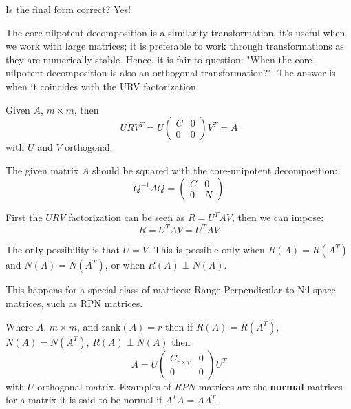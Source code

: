 Is the final form correct? Yes!

The core-nilpotent decomposition is a similarity transformation, it's useful when we work with large matrices;
it is preferable to work through transformations as they are numerically stable. 
Hence, it is fair to question: 
"When the core-nilpotent decomposition is also an orthogonal transformation?".
The answer is when it coincides with the URV factorization

Given \( A \), \( m \times m \), then
\[
U R V^T = U
\begin{pmatrix}
C & 0 \\
0 & 0
\end{pmatrix}
V^T = A
\]
with \( U \) and \( V \) orthogonal.


The given matrix \( A \) should be squared with the core-unipotent decomposition:
\[
Q^{-1} A Q = \begin{pmatrix}
C & 0 \\
0 & N
\end{pmatrix}
\]

First the $URV$ factorization can be seen as $ R = U^T A V $, then
we can impose:
\[ R = U^{T}AV = U^TA V \]

The only possibility is that \( U = V \). This is possible only when \( R(A) = R(A^T) \) and \( N(A) = N(A^T) \), or when \( R(A) \perp N(A) \).

This happens for a special class of matrices: Range-Perpendicular-to-Nil space matrices, such as RPN matrices.


Where \( A \), \( m \times m \), and \(\text{rank}(A) = r \) then if \( R(A) = R(A^T) \), \( N(A) = N(A^T) \), \( R(A) \perp N(A) \) then
\[ 
A = U \begin{pmatrix}
C_{r \times r} & 0 \\
0 & 0
\end{pmatrix} U^T
\]
with \( U \) orthogonal matrix. Examples of \( RPN \) matrices are the \textbf{normal} matrices for a matrix it is said to be normal if \( A^T A = AA^T \).

